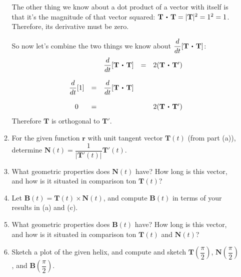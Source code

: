 \documentclass[10pt]{article}
\newcommand{\vr}{\mathbf{r}}
\newcommand{\vT}{\mathbf{T}}
\newcommand{\vN}{\mathbf{N}}
\newcommand{\vB}{\mathbf{B}}
\newcommand\dotp[1][.5]{\,\mathbin{\vcenter{\hbox{\scalebox{#1}{$\bullet$}}}}\,}
\newenvironment{red}{\color{red}}{\ignorespacesafterend}
\begin{document}
\begin{enumerate}[leftmargin=0pt]
\begin{enumerate}
\begin{red}
        The other thing we know about a dot product of a vector with itself is that it's the magnitude of that vector squared: $\vT \dotp \vT = |\vT|^2 = 1^2 = 1$. Therefore, its derivative must be zero.

        So now let's combine the two things we know about $\dfrac{d}{dt}[\vT\dotp\vT]$:
        \[
        \begin{array}{ccccc}
             && \dfrac{d}{dt}[\vT\dotp\vT] &=& 2(\vT\dotp \vT') \\
             &&&&\\
             \dfrac{d}{dt}[1] &=& \dfrac{d}{dt}[\vT\dotp\vT] && \\
             &&&&\\
             0 &=& && 2(\vT\dotp \vT')
        \end{array}
        \]
        Therefore $\vT$ is orthogonal to $\vT'$.
    \end{red}
    \item For the given function $\vr$ with unit tangent vector $\vT(t)$ (from part (a)), determine $\vN(t) = \dfrac{1}{|\vT'(t)|} \vT'(t)$.
    \item What geometric properties does $\vN(t)$ have? How long is this vector, and how is it situated in comparison ton $\vT(t)$?
    \item Let $\vB(t) = \vT(t) \times \vN(t)$, and compute $\vB(t)$ in terms of your results in (a) and (c).
    \item What geometric properties does $\vB(t)$ have? How long is this vector, and how is it situated in comparison ton $\vT(t)$ and $\vN(t)$?
    \item Sketch a plot of the given helix, and compute and sketch $\vT\left(\dfrac\pi2\right)$, $\vN\left(\dfrac\pi2\right)$, and $\vB\left(\dfrac\pi2\right)$.
\end{enumerate}

\end{enumerate}
	
\end{document}
